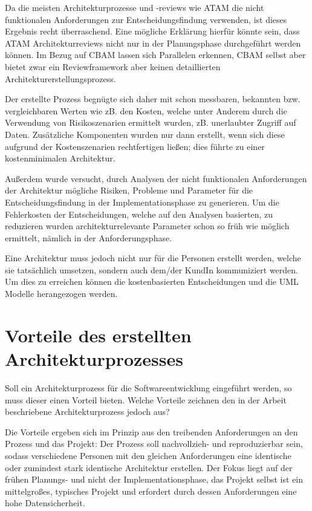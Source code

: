 Da die meisten Architekturprozesse und -reviews wie ATAM die nicht funktionalen Anforderungen zur Entscheidungsfindung verwenden, ist dieses Ergebnis recht überraschend. Eine mögliche Erklärung hierfür könnte sein, dass ATAM Architekturreviews nicht nur in der Planungsphase durchgeführt werden können. Im Bezug auf CBAM lassen sich Parallelen erkennen, CBAM selbst aber bietet zwar ein Reviewframework aber keinen detaillierten Architekturerstellungsprozess.

Der erstellte Prozess begnügte sich daher mit schon messbaren, bekannten bzw. vergleichbaren Werten wie zB. den Kosten, welche unter Anderem durch die Verwendung von Risikoszenarien ermittelt wurden, zB. unerlaubter Zugriff auf Daten. Zusätzliche Komponenten wurden nur dann erstellt, wenn sich diese aufgrund der Kostenszenarien rechtfertigen ließen; dies führte zu einer kostenminimalen Architektur.

Außerdem wurde versucht, durch Analysen der nicht funktionalen Anforderungen der Architektur mögliche Risiken, Probleme und Parameter für die Entscheidungsfindung in der Implementationsphase zu generieren. Um die Fehlerkosten der Entscheidungen, welche auf den Analysen basierten, zu reduzieren wurden architekturrelevante Parameter schon so früh wie möglich ermittelt, nämlich in der Anforderungsphase.

Eine Architektur muss jedoch nicht nur für die Personen erstellt werden, welche sie tatsächlich umsetzen, sondern auch dem/der KundIn kommuniziert werden. Um dies zu erreichen können die kostenbasierten Entscheidungen und die UML Modelle herangezogen werden.


\section{Vorteile des erstellten Architekturprozesses}
Soll ein Architekturprozess für die Softwareentwicklung eingeführt werden, so muss dieser einen Vorteil bieten. Welche Vorteile zeichnen den in der Arbeit beschriebene Architekturprozess jedoch aus?

Die Vorteile ergeben sich im Prinzip aus den treibenden Anforderungen an den Prozess und das Projekt: Der Prozess soll nachvollzieh- und reproduzierbar sein, sodass verschiedene Personen mit den gleichen Anforderungen eine identische oder zumindest stark identische Architektur erstellen. Der Fokus liegt auf der frühen Planungs- und nicht der Implementationsphase, das Projekt selbst ist ein mittelgroßes, typisches Projekt und erfordert durch dessen Anforderungen eine hohe Datensicherheit.

